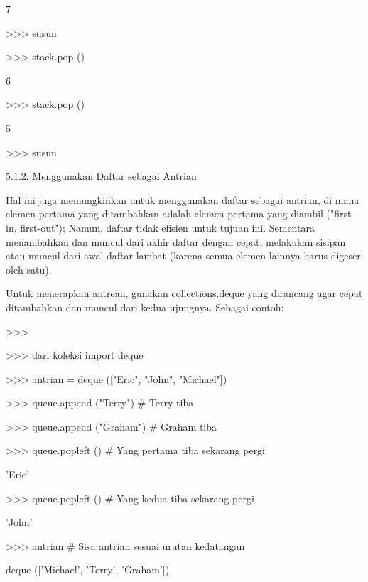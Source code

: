 7 \par
>>> susun \par
[3, 4, 5, 6] \par
>>> stack.pop () \par
6 \par
>>> stack.pop () \par
5 \par
>>> susun \par
[3, 4] \par
\vspace{12pt}
5.1.2. Menggunakan Daftar sebagai Antrian \par
\vspace{12pt}
Hal ini juga memungkinkan untuk menggunakan daftar sebagai antrian, di mana elemen pertama yang ditambahkan adalah elemen pertama yang diambil ("first-in, first-out"); Namun, daftar tidak efisien untuk tujuan ini. Sementara menambahkan dan muncul dari akhir daftar dengan cepat, melakukan sisipan atau muncul dari awal daftar lambat (karena semua elemen lainnya harus digeser oleh satu). \par
\vspace{12pt}
Untuk menerapkan antrean, gunakan collections.deque yang dirancang agar cepat ditambahkan dan muncul dari kedua ujungnya. Sebagai contoh: \par
>>> \par
\vspace{12pt}
>>> dari koleksi import deque \par
>>> antrian = deque (["Eric", "John", "Michael"]) \par
>>> queue.append ("Terry")    \#   Terry tiba \par
>>> queue.append ("Graham")    \#   Graham tiba \par
>>> queue.popleft ()    \#   Yang pertama tiba sekarang pergi \par
'Eric' \par
>>> queue.popleft ()    \#   Yang kedua tiba sekarang pergi \par
'John' \par
>>> antrian    \#   Sisa antrian sesuai urutan kedatangan \par
deque (['Michael', 'Terry', 'Graham']) \par
\vspace{12pt}
